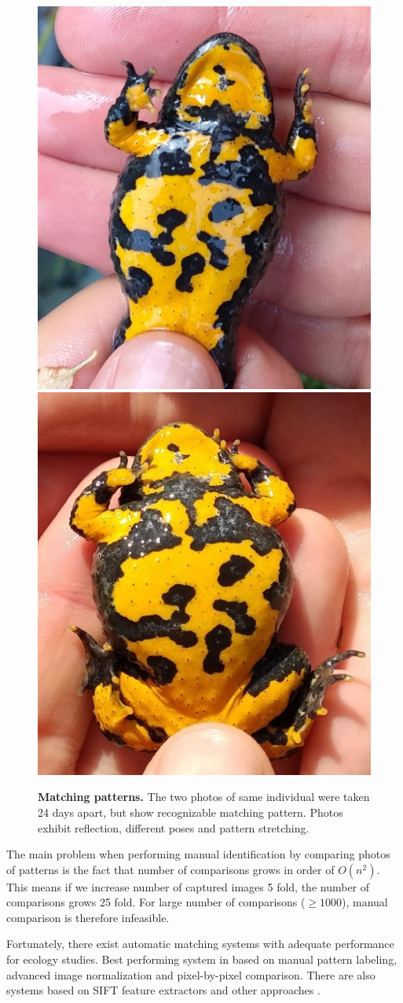 \documentclass[fleqn,moreauthors,10pt]{ds_report}
\begin{document}
\begin{figure}[htb]\centering
	\includegraphics[width=0.49\linewidth]{hermiona_1.jpg}
	\includegraphics[width=0.49\linewidth]{hermiona_2.jpg}
	\caption{\textbf{Matching patterns.} The two photos of same individual were taken 24 days apart, but show recognizable matching pattern. Photos exhibit reflection, different poses and pattern stretching.}
	\label{fig:hermiona}
\end{figure}

The main problem when performing manual identification by comparing photos of patterns is the fact that number of comparisons grows in order of $O(n^2)$. This means if we increase number of captured images 5 fold, the number of comparisons grows 25 fold. For large number of comparisons ($\ge1000$), manual comparison is therefore infeasible.

Fortunately, there exist automatic matching systems with adequate performance for ecology studies. Best performing system in based on manual pattern labeling, advanced image normalization and pixel-by-pixel comparison. There are also systems based on SIFT feature extractors and other approaches \cite{ident_comparison}.
\end{document}
